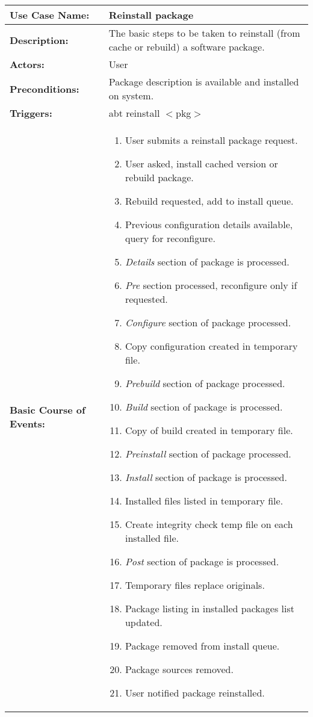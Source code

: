 \begin{tabularx}{\linewidth}{|l|X|}
\hline
\textbf{Use Case Name:} & \textbf{Reinstall package} \\
\hline
\textbf{Description:} & 
The basic steps to be taken to reinstall (from cache or rebuild) a software package.\\
\hline
\textbf{Actors:} & User \\
\hline
\textbf{Preconditions:} & Package description is available and installed on system. \\
\hline
\textbf{Triggers:} & abt reinstall $<$pkg$>$ \\
\hline
\textbf{Basic Course of Events:} & 
\begin{minipage}{\linewidth} 
  \vspace{0.02em}
  \begin{enumerate}
    \item User submits a reinstall package request.
    \item User asked, install cached version or rebuild package.
    \item Rebuild requested, add to install queue.
    \item Previous configuration details available, query for reconfigure.
    \item \emph{Details} section of package is processed.
    \item \emph{Pre} section processed, reconfigure only if requested.
    \item \emph{Configure} section of package processed.
    \item Copy configuration created in temporary file.
    \item \emph{Prebuild} section of package processed.
    \item \emph{Build} section of package is processed.
    \item Copy of build created in temporary file.
    \item \emph{Preinstall} section of package processed.
    \item \emph{Install} section of package is processed.
    \item Installed files listed in temporary file.
    \item Create integrity check temp file on each installed file.
    \item \emph{Post} section of package is processed.
    \item Temporary files replace originals.
    \item Package listing in installed packages list updated.
    \item Package removed from install queue.
    \item Package sources removed.
    \item User notified package reinstalled.
  \end{enumerate}
  \vspace{0.02em}
\end{minipage}
\\
\hline
\end{tabularx}

